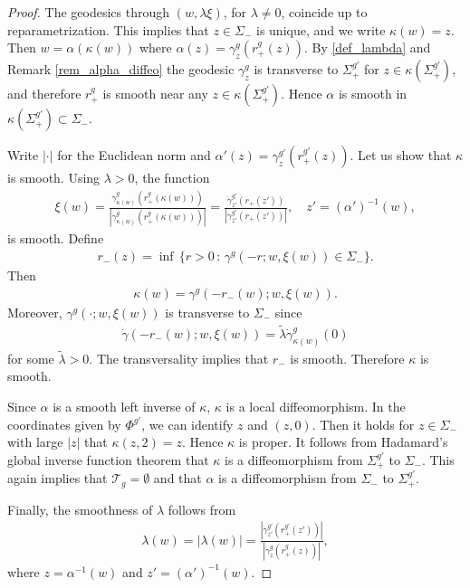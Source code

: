 \documentclass[11pt,letterpaper]{amsart}
\theoremstyle{definition}
\numberwithin{equation}{section}
\begin{document}
\begin{proof}
The geodesics through $(w, \lambda \xi)$, for $\lambda \ne 0$, coincide up to reparametrization. This implies that $z \in \Sigma_{-}$ is unique, and we write $\kappa(w) = z$. Then $w = \alpha(\kappa(w))$ where $\alpha(z) = \gamma_z^{g}(r_+^{g}(z))$. By \eqref{def_lambda} and Remark \ref{rem_alpha_diffeo} the geodesic $\gamma_z^{g}$ is transverse to $\Sigma_+^{g'}$ for $z \in \kappa(\Sigma_+^{g'})$, and therefore $r_+^{g}$ is smooth near any $z \in \kappa(\Sigma_+^{g'})$. Hence $\alpha$ is smooth in $\kappa(\Sigma_+^{g'}) \subset \Sigma_-$. 

Write $|\cdot|$ for the Euclidean norm and $\alpha'(z) = \gamma_z^{g'}(r_+^{g'}(z))$. Let us show that $\kappa$ is smooth. 
Using $\lambda > 0$, the function 
    \begin{align*}
\xi(w) 
= 
\frac{\dot \gamma_{\kappa(w)}^{g}(r_+^{g}(\kappa(w)))}
{|\dot \gamma_{\kappa(w)}^{g}(r_+^{g}(\kappa(w)))|} 
= 
\frac{\dot \gamma^{g'}_{z'}(r_+(z'))}
{|\dot \gamma^{g'}_{z'}(r_+(z'))|},
\quad 
z' = (\alpha')^{-1}(w),
    \end{align*}
is smooth. Define
    \begin{align*}
r_-(z) = \inf \,\{ r > 0 \,:\, \gamma^{g}(-r; w, \xi(w)) \in \Sigma_- \}.
    \end{align*}
Then
    \begin{align*}
\kappa(w) = \gamma^{g}(-r_-(w); w,\xi(w)).
    \end{align*}
Moreover, $\gamma^{g}(\cdot; w,\xi(w))$ is transverse to $\Sigma_-$ since
    \begin{align*}
\dot \gamma(-r_-(w); w,\xi(w))
=
\tilde \lambda \dot \gamma_{\kappa(w)}^{g}(0)
    \end{align*}
for some $\tilde \lambda > 0$.
The transversality implies that $r_-$ is smooth. Therefore $\kappa$ is smooth.

Since $\alpha$ is a smooth left inverse of $\kappa$, $\kappa$ is a local diffeomorphism. In the coordinates given by $\Phi^{g'}$, we can identify $z$ and $(z, 0)$. Then it holds for $z \in \Sigma_-$ with large $|z|$ that $\kappa(z, 2) = z$. Hence $\kappa$ is proper. It follows from Hadamard's global inverse function theorem that $\kappa$ is a diffeomorphism from $\Sigma_+^{g'}$ to $\Sigma_-$. This again implies that $\mathcal T_{g} = \emptyset$ and that $\alpha$ is a diffeomorphism from $\Sigma_-$ to $\Sigma_+^{g'}$.

Finally, the smoothness of $\lambda$ follows from 
    \begin{align*}
\lambda(w) = |\lambda(w)| = \frac{|\dot \gamma_{z'}^{g'}(r_+^{g'}(z'))|}{|\dot \gamma_z^g(r_+^{g}(z))|},
    \end{align*}
where $z = \alpha^{-1}(w)$ and $z' = (\alpha')^{-1}(w)$.
\end{proof}
\end{document}
